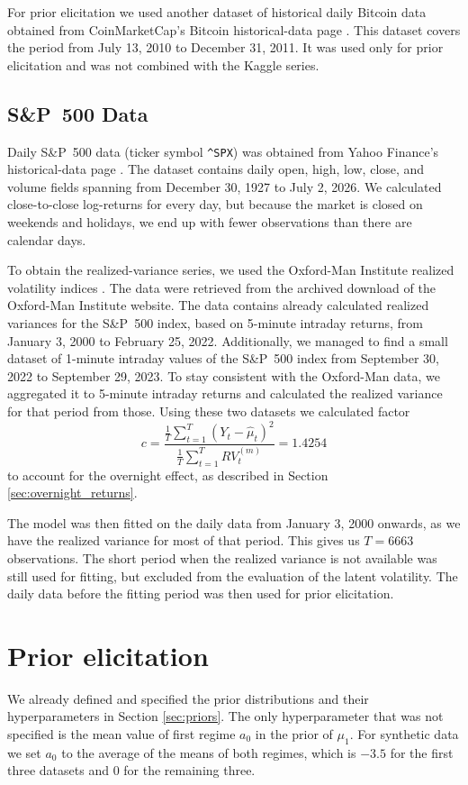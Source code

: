 For prior elicitation we used another dataset of historical daily Bitcoin data
obtained from CoinMarketCap's Bitcoin historical-data page
\cite{coinmarketcap2026bitcoin}.  This dataset covers the period from
July 13, 2010 to December 31, 2011.  It was used only for prior elicitation and
was not combined with the Kaggle series.

\subsection{S\&P~500 Data}
Daily S\&P~500 data (ticker symbol \texttt{\textasciicircum SPX}) was obtained from Yahoo
Finance's historical-data page \cite{yahoofinance2026sp500}. The dataset contains daily open, high, low, close, and volume fields spanning from December 30, 1927 to July 2, 2026. 
We calculated close-to-close log-returns for every day, but because the market is closed on weekends and holidays, we end up with fewer observations than there are calendar days. 

To obtain the realized-variance series, we used the Oxford-Man Institute
realized volatility indices \cite{oxfordman2022realizedvolatility}.  The data
were retrieved from the archived download of the Oxford-Man Institute
website. The data contains already calculated realized variances for the S\&P~500 index, based on 5-minute intraday returns, from January 3, 2000 to February 25, 2022.
Additionally, we managed to find a small dataset of 1-minute intraday values of the S\&P~500 index from September 30, 2022 to September 29, 2023. To stay consistent with the Oxford-Man data, we aggregated it to 5-minute intraday returns and calculated the realized variance for that period from those.
Using these two datasets we calculated factor
\[
c = \frac{\frac{1}{T}\sum_{t=1}^T \left(Y_t - \hat{\mu}_t\right)^2}{\frac{1}{T}\sum_{t=1}^T RV_t^{(m)}} = 1.4254
\]
to account for the overnight effect, as described in Section \ref{sec:overnight_returns}. 

The model was then fitted on the daily data from January 3, 2000 onwards, as we have the realized variance for most of that period. This gives us $T=6663$ observations. The short period when the realized variance is not available was still used for fitting, but excluded from the evaluation of the latent volatility.
The daily data before the fitting period was then used for prior elicitation.

\section{Prior elicitation}
We already defined and specified the prior distributions and their hyperparameters in Section \ref{sec:priors}. The only hyperparameter that was not specified is the mean value of first regime $a_0$ in the prior of $\mu_1$.
For synthetic data we set $a_0$ to the average of the means of both regimes, which is $-3.5$ for the first three datasets and $0$ for the remaining three.

